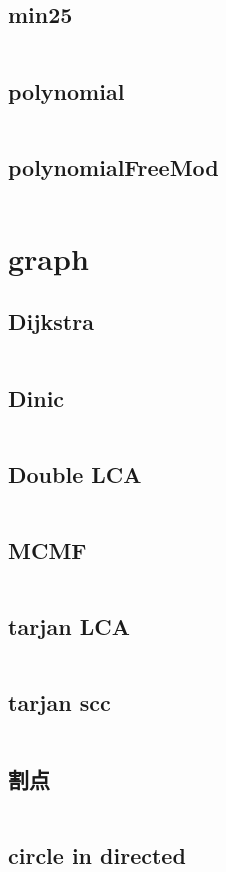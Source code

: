   \subsection{min25}
    \inputminted{cpp}{../code/math/min25.cpp}
  \subsection{polynomial}
    \inputminted{cpp}{../code/math/polynomial.cpp}
  \subsection{polynomialFreeMod}
    \inputminted{cpp}{../code/math/polynomialFreeMod.cpp}
\section{graph}
  \subsection{Dijkstra}
    \inputminted{cpp}{../code/graph/Dijkstra.cpp}
  \subsection{Dinic}
    \inputminted{cpp}{../code/graph/Dinic.cpp}
  \subsection{Double LCA}
    \inputminted{cpp}{../code/graph/Double_LCA.cpp}
  \subsection{MCMF}
    \inputminted{cpp}{../code/graph/MCMF.cpp}
  \subsection{tarjan LCA}
    \inputminted{cpp}{../code/graph/tarjan_LCA.cpp}
  \subsection{tarjan scc}
    \inputminted{cpp}{../code/graph/tarjan_scc.cpp}
  \subsection{割点}
    \inputminted{cpp}{../code/graph/割点.cpp}
  \subsection{circle in directed}
    \inputminted{cpp}{../code/graph/circle_in_directed.cpp}
